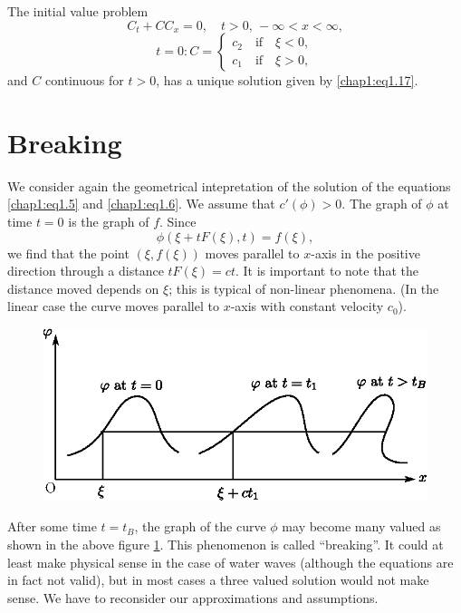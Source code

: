 \begin{theorem*}
The initial value problem
$$
C_t+CC_x = 0, \quad t>0, \, -\infty < x < \infty,
$$
\begin{equation*}
t=0: C=
\begin{cases}
c_2\quad\text{if}\quad \xi < 0,\\
c_1\quad\text{if}\quad \xi > 0,
\end{cases}
\end{equation*}
and $C$ continuous for $t>0$, has a unique solution given by
\eqref{chap1:eq1.17}.
\end{theorem*}

\section{Breaking}\label{chap1:sec1.5}\pageoriginale

We consider again the geometrical intepretation of the solution of the equations \eqref{chap1:eq1.5} and \eqref{chap1:eq1.6}. We assume that $c'(\phi)>0$. The graph of $\phi$ at time $t=0$ is the graph of $f$. Since
$$
\phi(\xi+tF(\xi),t)=f(\xi),
$$
we find that the point $(\xi, f(\xi))$ moves parallel to $x$-axis in the positive direction through a distance $tF(\xi)=ct$. It is important to note that the distance moved depends on $\xi$; this is typical of non-linear phenomena. (In the linear case the curve moves parallel to $x$-axis with constant velocity $c_0$).

\begin{figure}[H]
\centering
\includegraphics{figures/fig61-1.6.eps}
\caption{}
\label{chap1:fig1.6}
\end{figure}

After some time $t=t_B$, the graph of the curve $\phi$ may become many valued as shown in the above figure \ref{chap1:fig1.6}. This phenomenon is called ``breaking''. It could at least make physical sense in the case of water waves (although the equations are in fact not valid), but in most cases a three valued solution would not make sense. We have to reconsider our approximations and assumptions. 

